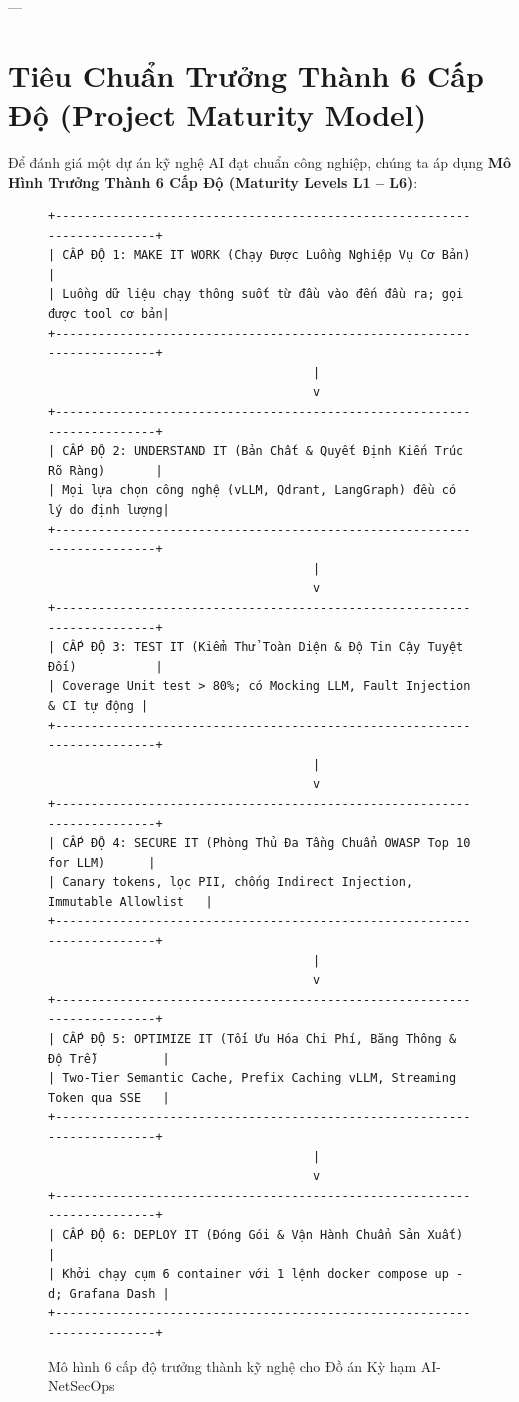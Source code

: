 ---

\section{Tiêu Chuẩn Trưởng Thành 6 Cấp Độ (Project Maturity Model)}
\label{sec:ch14-maturity-model}

Để đánh giá một dự án kỹ nghệ AI đạt chuẩn công nghiệp, chúng ta áp dụng \textbf{Mô Hình Trưởng Thành 6 Cấp Độ (Maturity Levels L1 -- L6)}:

\begin{figure}[htbp]
\centering
\small
\begin{verbatim}
+-------------------------------------------------------------------------+
| CẤP ĐỘ 1: MAKE IT WORK (Chạy Được Luồng Nghiệp Vụ Cơ Bản)               |
| Luồng dữ liệu chạy thông suốt từ đầu vào đến đầu ra; gọi được tool cơ bản|
+-------------------------------------------------------------------------+
                                     |
                                     v
+-------------------------------------------------------------------------+
| CẤP ĐỘ 2: UNDERSTAND IT (Bản Chất & Quyết Định Kiến Trúc Rõ Ràng)       |
| Mọi lựa chọn công nghệ (vLLM, Qdrant, LangGraph) đều có lý do định lượng|
+-------------------------------------------------------------------------+
                                     |
                                     v
+-------------------------------------------------------------------------+
| CẤP ĐỘ 3: TEST IT (Kiểm Thử Toàn Diện & Độ Tin Cậy Tuyệt Đối)           |
| Coverage Unit test > 80%; có Mocking LLM, Fault Injection & CI tự động |
+-------------------------------------------------------------------------+
                                     |
                                     v
+-------------------------------------------------------------------------+
| CẤP ĐỘ 4: SECURE IT (Phòng Thủ Đa Tầng Chuẩn OWASP Top 10 for LLM)      |
| Canary tokens, lọc PII, chống Indirect Injection, Immutable Allowlist   |
+-------------------------------------------------------------------------+
                                     |
                                     v
+-------------------------------------------------------------------------+
| CẤP ĐỘ 5: OPTIMIZE IT (Tối Ưu Hóa Chi Phí, Băng Thông & Độ Trễ)         |
| Two-Tier Semantic Cache, Prefix Caching vLLM, Streaming Token qua SSE   |
+-------------------------------------------------------------------------+
                                     |
                                     v
+-------------------------------------------------------------------------+
| CẤP ĐỘ 6: DEPLOY IT (Đóng Gói & Vận Hành Chuẩn Sản Xuất)                |
| Khởi chạy cụm 6 container với 1 lệnh docker compose up -d; Grafana Dash |
+-------------------------------------------------------------------------+
\end{verbatim}
\caption{Mô hình 6 cấp độ trưởng thành kỹ nghệ cho Đồ án Kỳ hạm AI-NetSecOps}
\label{fig:maturity-model}
\end{figure}

